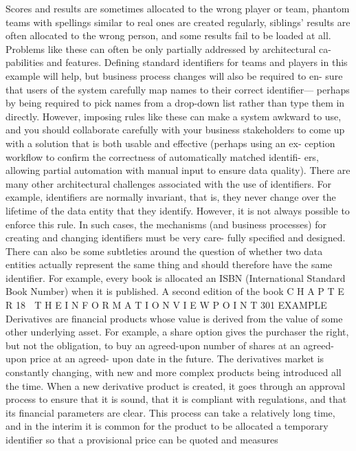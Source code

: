 Scores and results are sometimes allocated to the wrong player or team,
phantom teams with spellings similar to real ones are created regularly,
siblings’ results are often allocated to the wrong person, and some results
fail to be loaded at all.
Problems like these can often be only partially addressed by architectural ca-
pabilities and features. Defining standard identifiers for teams and players in
this example will help, but business process changes will also be required to en-
sure that users of the system carefully map names to their correct identifier—
perhaps by being required to pick names from a drop-down list rather than type
them in directly. However, imposing rules like these can make a system awkward
to use, and you should collaborate carefully with your business stakeholders to
come up with a solution that is both usable and effective (perhaps using an ex-
ception workflow to confirm the correctness of automatically matched identifi-
ers, allowing partial automation with manual input to ensure data quality).
There are many other architectural challenges associated with the use of
identifiers. For example, identifiers are normally invariant, that is, they never
change over the lifetime of the data entity that they identify. However, it is
not always possible to enforce this rule. In such cases, the mechanisms (and
business processes) for creating and changing identifiers must be very care-
fully specified and designed.
There can also be some subtleties around the question of whether two
data entities actually represent the same thing and should therefore have the
same identifier. For example, every book is allocated an ISBN (International
Standard Book Number) when it is published. A second edition of the book
C H A P T E R 18  T H E I N F O R M A T I O N V I E W P O I N T
 301
EXAMPLE Derivatives are financial products whose value is derived
from the value of some other underlying asset. For example, a share
option gives the purchaser the right, but not the obligation, to buy an
agreed-upon number of shares at an agreed-upon price at an agreed-
upon date in the future. The derivatives market is constantly changing,
with new and more complex products being introduced all the time.
When a new derivative product is created, it goes through an approval
process to ensure that it is sound, that it is compliant with regulations, and
that its financial parameters are clear. This process can take a relatively
long time, and in the interim it is common for the product to be allocated a
temporary identifier so that a provisional price can be quoted and measures
